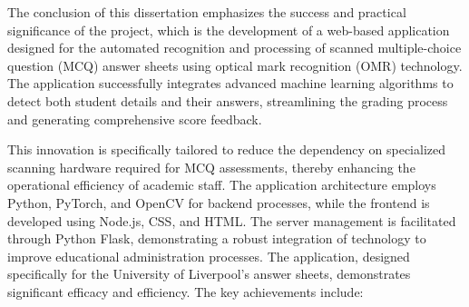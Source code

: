 \documentclass[twocolumn]{article}
\begin{document}
The conclusion of this dissertation emphasizes the success and practical significance of the project, which is the development of a web-based application designed for the automated recognition and processing of scanned multiple-choice question (MCQ) answer sheets using optical mark recognition (OMR) technology. The application successfully integrates advanced machine learning algorithms to detect both student details and their answers, streamlining the grading process and generating comprehensive score feedback.

This innovation is specifically tailored to reduce the dependency on specialized scanning hardware required for MCQ assessments, thereby enhancing the operational efficiency of academic staff. The application architecture employs Python, PyTorch, and OpenCV for backend processes, while the frontend is developed using Node.js, CSS, and HTML. The server management is facilitated through Python Flask, demonstrating a robust integration of technology to improve educational administration processes. The application, designed specifically for the University of Liverpool's answer sheets, demonstrates significant efficacy and efficiency. The key achievements include:
\end{document}
